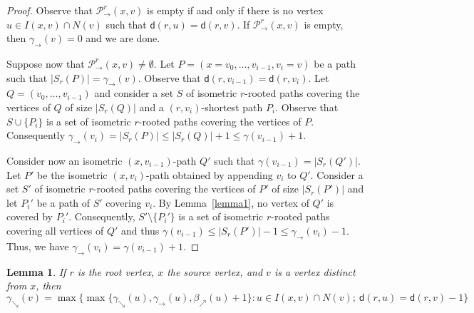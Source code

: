 \documentclass[a4paper]{article}
\newcommand{\dist}[2]{\mathsf{d}\left(#1,#2\right)}
\newcommand{\coverP}[2]{S_{#1}\left(#2\right)}
\newcommand{\pathseteq}[3]{\mathcal{P}_{\rightarrow}^{#1}\left(#2,#3\right)}
\newtheorem{lemma}[theorem]{Lemma}
\begin{document}
\begin{proof}
  Observe that $\pathseteq{r}{x}{v}$ is empty if and only if there is
  no vertex $u\in I(x,v) \cap N(v)$ such that
  $\dist{r}{u}=\dist{r}{v}$. If $\pathseteq{r}{x}{v}$ is empty, then
  $\gamma_{\rightarrow}(v) =0$ and we are done.
  
  Suppose now that $\pathseteq{r}{x}{v} \neq \emptyset$.  Let
  $P=(x=v_0,\dots,v_{i-1},v_i=v)$ be a path such that
  $|\coverP{r}{P}| = \gamma_{\rightarrow}(v)$. Observe that
  $\dist{r}{v_{i-1}}=\dist{r}{v_i}$.  Let $Q = (v_0,\dots,v_{i-1})$
  and consider a set $S$ of isometric $r$-rooted paths covering the
  vertices of $Q$ of size $|\coverP{r}{Q}|$ and a $(r,v_i)$-shortest
  path $P_i$. Observe that $S \cup \{P_{i}\}$ is a set of isometric
  $r$-rooted paths covering the vertices of $P$. Consequently
  $\gamma_{\rightarrow}(v_i) = |\coverP{r}{P}| \leq |\coverP{r}{Q}|+1
  \leq \gamma(v_{i-1})+1$.

  Consider now an isometric $(x,v_{i-1})$-path $Q'$ such that
  $\gamma(v_{i-1}) = |\coverP{r}{Q'}|$. Let $P'$ be the isometric
  $(x,v_i)$-path obtained by appending $v_i$ to $Q'$. Consider a set
  $S'$ of isometric $r$-rooted paths covering the vertices of $P'$ of
  size $|\coverP{r}{P'}|$ and let $P_i' $ be a path of $S'$ covering
  $v_i$.  By Lemma~\ref{lemma1}, no vertex of $Q'$ is covered by
  $P_i'$. Consequently, $S'\setminus \{P_i'\}$ is a set of isometric
  $r$-rooted paths covering all vertices of $Q'$ and thus
  $\gamma(v_{i-1}) \leq |\coverP{r}{P'}| -1 \leq
  \gamma_{\rightarrow}(v_i) -1$. Thus, we have
  $\gamma_{\rightarrow}(v_i) = \gamma(v_{i-1}) +1$.
\end{proof}

\begin{lemma}\label{lem:gamma-searrow}
  If $r$ is the root vertex, $x$ the source vertex, and $v$ is a
  vertex distinct from $x$, then
  $\gamma_{\searrow}(v) = \max \{
  \max\{\gamma_{\searrow}(u),\gamma_{\rightarrow}(u),\beta_{\nearrow}(u)+1\}
  : u\in I(x,v) \cap N(v);\ \dist{r}{u}=\dist{r}{v}-1 \}$
\end{lemma}
\end{document}
